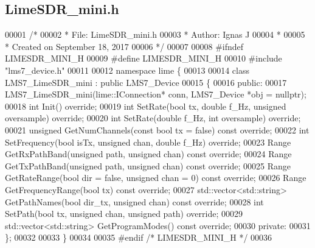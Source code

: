 \subsection{Lime\+S\+D\+R\+\_\+mini.\+h}
\label{LimeSDR__mini_8h_source}

\begin{DoxyCode}
00001 \textcolor{comment}{/*}
00002 \textcolor{comment}{ * File:   LimeSDR\_mini.h}
00003 \textcolor{comment}{ * Author: Ignas J}
00004 \textcolor{comment}{ *}
00005 \textcolor{comment}{ * Created on September 18, 2017}
00006 \textcolor{comment}{ */}
00007 
00008 \textcolor{preprocessor}{#ifndef LIMESDR\_MINI\_H}
00009 \textcolor{preprocessor}{#define LIMESDR\_MINI\_H}
00010 \textcolor{preprocessor}{#include "lms7_device.h"}
00011 
00012 \textcolor{keyword}{namespace }lime \{
00013 
00014 \textcolor{keyword}{class }LMS7_LimeSDR_mini : \textcolor{keyword}{public} LMS7_Device
00015 \{
00016 \textcolor{keyword}{public}:
00017     LMS7_LimeSDR_mini(lime::IConnection* conn, LMS7_Device *obj = \textcolor{keyword}{nullptr});
00018     \textcolor{keywordtype}{int} Init() \textcolor{keyword}{override};
00019     \textcolor{keywordtype}{int} SetRate(\textcolor{keywordtype}{bool} tx, \textcolor{keywordtype}{double} f\_Hz, \textcolor{keywordtype}{unsigned} oversample) \textcolor{keyword}{override};
00020     \textcolor{keywordtype}{int} SetRate(\textcolor{keywordtype}{double} f\_Hz, \textcolor{keywordtype}{int} oversample) \textcolor{keyword}{override};
00021     \textcolor{keywordtype}{unsigned} GetNumChannels(\textcolor{keyword}{const} \textcolor{keywordtype}{bool} tx = \textcolor{keyword}{false}) \textcolor{keyword}{const override};
00022     \textcolor{keywordtype}{int} SetFrequency(\textcolor{keywordtype}{bool} isTx, \textcolor{keywordtype}{unsigned} chan, \textcolor{keywordtype}{double} f\_Hz) \textcolor{keyword}{override};
00023     Range GetRxPathBand(\textcolor{keywordtype}{unsigned} path, \textcolor{keywordtype}{unsigned} chan) \textcolor{keyword}{const override};
00024     Range GetTxPathBand(\textcolor{keywordtype}{unsigned} path, \textcolor{keywordtype}{unsigned} chan) \textcolor{keyword}{const override};
00025     Range GetRateRange(\textcolor{keywordtype}{bool} dir = \textcolor{keyword}{false}, \textcolor{keywordtype}{unsigned} chan = 0) \textcolor{keyword}{const override};
00026     Range GetFrequencyRange(\textcolor{keywordtype}{bool} tx) \textcolor{keyword}{const override};
00027     std::vector<std::string> GetPathNames(\textcolor{keywordtype}{bool} dir_tx, \textcolor{keywordtype}{unsigned} chan) \textcolor{keyword}{const override};
00028     \textcolor{keywordtype}{int} SetPath(\textcolor{keywordtype}{bool} tx, \textcolor{keywordtype}{unsigned} chan, \textcolor{keywordtype}{unsigned} path) \textcolor{keyword}{override};
00029     std::vector<std::string> GetProgramModes() \textcolor{keyword}{const override};
00030 \textcolor{keyword}{private}:
00031 \};
00032 
00033 \}
00034 
00035 \textcolor{preprocessor}{#endif  }\textcolor{comment}{/* LIMESDR\_MINI\_H */}\textcolor{preprocessor}{}
00036 
\end{DoxyCode}
